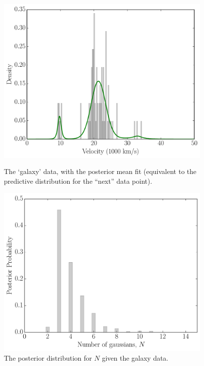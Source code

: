 \documentclass[article, nojss]{jss}
\begin{document}
\begin{figure}
\begin{minipage}{0.45\textwidth}
\centering
\includegraphics[width=0.95\textwidth]{figures/galaxies.pdf}
\caption{The `galaxy' data, with the posterior mean fit
(equivalent to the predictive distribution for the ``next'' data point).\label{fig:galaxies}}
\end{minipage} \hspace{0.05\textwidth}
\begin{minipage}{0.45\textwidth}
\centering
\includegraphics[width=0.95\textwidth]{figures/galaxies_N.pdf}
\caption{The posterior distribution for $N$ given the
galaxy data.\label{fig:galaxies_N}}
\end{minipage}
\end{figure}
\end{document}
